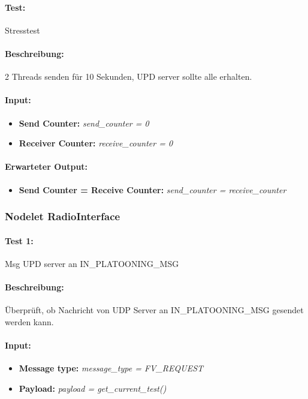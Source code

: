 \documentclass[a4paper, 12pt, titlepage]{scrartcl}
\begin{document}
{			\paragraph{Test:}{Stresstest}
				\paragraph{Beschreibung:} 2 Threads senden für 10 Sekunden, UPD server sollte alle erhalten.
				\paragraph{Input:}
				\begin{itemize} \itemsep-0.5em
					\item \textbf{Send Counter:} \emph{send\_counter = 0}
					\item \textbf{Receiver Counter:} \emph{receive\_counter = 0}
				\end{itemize}
				\paragraph{Erwarteter Output:}
				\begin{itemize} \itemsep-0.5em
					\item \textbf{Send Counter = Receive Counter:} \emph{send\_counter = receive\_counter}
				\end{itemize}	
				
			\subsubsection{Nodelet RadioInterface}
			\label{node_radio_interface}
			\paragraph{Test 1:} {Msg UPD server an IN\_PLATOONING\_MSG}
			\paragraph{Beschreibung:} Überprüft, ob Nachricht von UDP Server an IN\_PLATOONING\_MSG gesendet werden kann.
			\paragraph{Input:}
			\begin{itemize} \itemsep-0.5em
				\item \textbf{Message type:} \emph{message\_type = FV\_REQUEST}
				\item \textbf{Payload:} \emph{payload = get\_current\_test()}
			\end{itemize}
}
\end{document}
